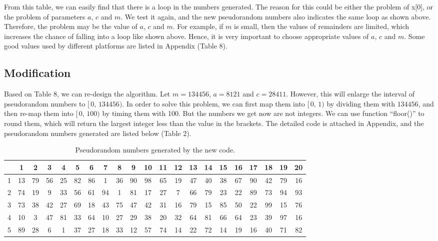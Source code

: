\documentclass[a4paper]{article}
\begin{document}
	From this table, we can easily find that there is a loop in the numbers generated. The reason for this could be either the problem of x[0], or the problem of parameters $a$, $c$ and $m$. We test it again, and the new pseudorandom numbers also indicates the same loop as shown above. Therefore, the problem may be the value of $a$, $c$ and $m$. For example, if $m$ is small, then the values of remainders are limited, which increases the chance of falling into a loop like shown above. Hence, it is very important to choose appropriate values of $a$, $c$ and $m$. Some good values used by different platforms are listed in Appendix (Table 8).


	\subsection{Modification}
	Based on Table 8, we can re-design the algorithm. Let $m=134456$, $a=8121$ and $c=28411$. However, this will enlarge the interval of pseudorandom numbers to $[\,0,\,134456)$. In order to solve this problem, we can first map them into $[\,0,\,1)$ by dividing them with $134456$, and then re-map them into $[\,0,\,100)$ by timing them with 100. But the numbers we get now are not integers. We can use function “floor()” to round them, which will return the largest integer less than the value in the  brackets. The detailed code is attached in Appendix, and the pseudorandom numbers generated are listed below (Table 2).

\begin{table}[H]
\centering
\begin{tabular}{|c|cccccccccccccccccccc|}
\hline
  & 1  & 2  & 3  & 4  & 5  & 6  & 7  & 8  & 9  & 10 & 11 & 12 & 13 & 14 & 15 & 16 & 17 & 18 & 19 & 20 \\ \hline
1 & 13 & 79 & 56 & 25 & 82 & 86 & 1  & 36 & 90 & 98 & 65 & 19 & 47 & 40 & 38 & 67 & 90 & 42 & 79 & 16 \\
2 & 74 & 19 & 9  & 33 & 56 & 61 & 94 & 1  & 81 & 17 & 27 & 7  & 66 & 79 & 23 & 22 & 89 & 73 & 94 & 93 \\
3 & 73 & 38 & 42 & 27 & 69 & 18 & 43 & 75 & 47 & 42 & 31 & 16 & 79 & 15 & 85 & 50 & 22 & 99 & 15 & 76 \\
4 & 10 & 3  & 47 & 81 & 33 & 64 & 10 & 27 & 29 & 38 & 20 & 32 & 64 & 81 & 66 & 64 & 23 & 39 & 97 & 16 \\
5 & 89 & 28 & 6  & 1  & 37 & 27 & 18 & 33 & 12 & 57 & 74 & 14 & 22 & 72 & 14 & 19 & 16 & 40 & 71 & 82 \\ \hline
\end{tabular}
\caption{Pseudorandom numbers generated by the new code.}
\end{table}
\end{document}
